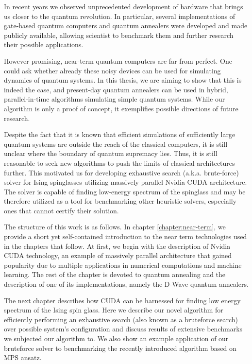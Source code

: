 In recent years we observed unprecedented development of hardware that brings us closer to the quantum revolution. In particular, several implementations of gate-based quantum computers and quantum annealers were developed and made publicly available, allowing scientist to benchmark them and further research their possible applications.

However promising, near-term quantum computers are far from perfect. One could ask whether already these noisy devices can be used for simulating dynamics of quantum systems. In this thesis, we are aiming to show that this is indeed the case, and present-day quantum annealers can be used in hybrid, parallel-in-time algorithms simulating simple quantum systems. While our algorithm is only a proof of concept, it exemplifies possible directions of future research.

Despite the fact that it is known that efficient simulations of sufficiently large quantum systems are outside the reach of the classical computers, it is still unclear where the boundary of quantum supremacy lies. Thus, it is still reasonable to seek new algorithms to push the limits of classical architectures further. This motivated us for developing exhaustive search (a.k.a. brute-force) solver for Ising spinglasses utilizing massively parallel Nvidia CUDA architecture. The solver is capable of finding low-energy spectrum of the spinglass and may be therefore utilized as a tool for benchmarking other heuristic solvers, especially ones that cannot certify their solution.

The structure of this work is as follows. In chapter \ref{chapter:near-term}, we provide a short yet self-contained introduction to the near term technologies used in the chapters that follow. At first, we begin with the description of Nvidia CUDA technology, an example of massively parallel architecture that gained popularity due to multiple applications in numerical computations and machine learning. The rest of the chapter is devoted to quantum annealing and the description of one of its implementations, namely the D-Wave quantum annealers.

The next chapter describes how CUDA can be harnessed for finding low energy spectrum of the Ising spin glass. Here we describe our novel algorithm for efficiently performing an exhaustive search (also known as a bruteforce search) over possible system's configuration and discuss results of extensive benchmarks we subjected our algorithm to. We also show an example application of our bruteforce solver to benchmarking the recently introduced algorithm based on MPS ansatz.

